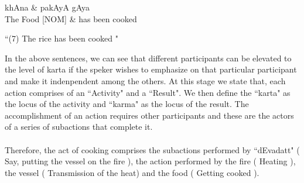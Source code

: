 \documentclass[twoside]{article}
\begin{document}
\hypertarget{fig7}{}
\begin{center}
\begin{dependency}[arc edge, arc angle=80, text only label, label style={above}]
   \begin{deptext}[column sep=1em]
      khAna \& pakAyA gAya \\
      The Food [NOM] \& has been cooked \\
   \end{deptext}
   
\end{dependency} 

 ``(7) The rice has been cooked " 
 

\end{center}
In the above sentences, we can see that different participants can be elevated to the level of karta if the speker wishes to emphasize on that particular participant and make it indenpendent among the others. 
At this stage we state that, each action comprises of an ``Activity" and a ``Result". We then define the ``karta" as the locus of the activity and ``karma" as the locus of the result. 
The accomplishment of an action requires other participants and these are the actors of a series of subactions that complete it. 
\paragraph{} Therefore, the act of cooking comprises the subactions performed by ``dEvadatt" ( Say, putting the vessel on the fire ), the action performed by the fire ( Heating ), the vessel ( Transmission of the heat) and the food ( Getting cooked ). 

\begin{center}


\end{center}

\end{document}
